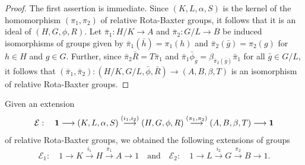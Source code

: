 \documentclass[11pt]{amsart}
\theoremstyle{thrm}
\theoremstyle{plain}
\theoremstyle{definition}
\numberwithin{equation}{section}
\begin{document}
\begin{proof}
The first assertion is immediate. Since $(K,L, \alpha,S)$ is the kernel of the homomorphism $(\pi_1, \pi_2)$ of relative Rota-Baxter groups, it follows that it is an ideal of $(H,G, \phi, R)$. Let $\bar{\pi}_1: H/K \rightarrow A$ and $\bar{\pi}_2: G/L \rightarrow B$ be induced isomorphisms of groups given by $\bar{\pi}_1(\bar{h})=\pi_1(h)$ and $\bar{\pi}_2(\bar{g})=\pi_2(g)$ for $h \in H$ and $g \in G$. Further, since $\bar{\pi}_2 \bar{R}= T\bar{\pi}_1$ and $\bar{\pi}_1 \bar{\phi}_{\bar{g}}= \beta_{\bar{\pi}_2(\bar{g})} \bar{\pi}_1$ for all $\bar{g} \in G/L$, it follows that $(\bar{\pi}_1, \bar{\pi}_2): (H/K, G/L, \bar{\phi}, \bar{R}) \to (A, B, \beta, T)$ is an isomorphism of relative Rota-Baxter groups. 
\end{proof}

Given an extension
$$\mathcal{E} : \quad  {\bf 1} \longrightarrow (K,L, \alpha,S ) \stackrel{(i_1, i_2)}{\longrightarrow}  (H,G, \phi, R) \stackrel{(\pi_1, \pi_2)}{\longrightarrow} (A,B, \beta, T) \longrightarrow {\bf 1}$$
 of  relative Rota-Baxter groups, we obtained the following  extensions of groups
$$\mathcal{E}_1 : \quad  1 \longrightarrow K \stackrel{i_1}{\longrightarrow}  H \stackrel{\pi_1 }{\longrightarrow} A \longrightarrow 1 \quad \textrm{and} \quad \mathcal{E}_2 : \quad  1 \longrightarrow L \stackrel{i_2}{\longrightarrow}  G \stackrel{\pi_2 }{\longrightarrow} B \longrightarrow 1.$$
\end{document}
